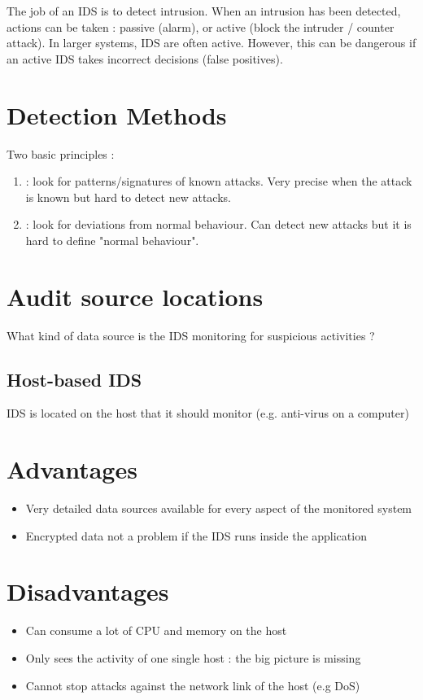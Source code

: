 The job of an IDS is to detect intrusion. When an intrusion has been detected, actions can be taken : passive (alarm), or active (block the intruder / counter attack). In larger systems, IDS are often active. However, this can be dangerous if an active IDS takes incorrect decisions (false positives).

\section{Detection Methods}

Two basic principles :
\begin{enumerate}
    \item {} : look for patterns/signatures of known attacks. Very precise when the attack is known but hard to detect new attacks.
    \item {} : look for deviations from normal behaviour. Can detect new attacks but it is hard to define "normal behaviour".
\end{enumerate}

\section{Audit source locations}

What kind of data source is the IDS monitoring for suspicious activities ?

\subsection{Host-based IDS}

IDS is located on the host that it should monitor (e.g. anti-virus on a computer)

\begin{minipage}[t]{0.46\textwidth}
    \section{Advantages}
    \begin{itemize}
        \item Very detailed data sources available for every aspect of the monitored system
        \item Encrypted data not a problem if the IDS runs inside the application
    \end{itemize}
\end{minipage}
\hfill
\begin{minipage}[t]{0.46\textwidth}
    \section{Disadvantages}
    \begin{itemize}
        \item Can consume a lot of CPU and memory on the host
        \item Only sees the activity of one single host : the big picture is missing
        \item Cannot stop attacks against the network link of the host (e.g DoS)
    \end{itemize}
\end{minipage}

